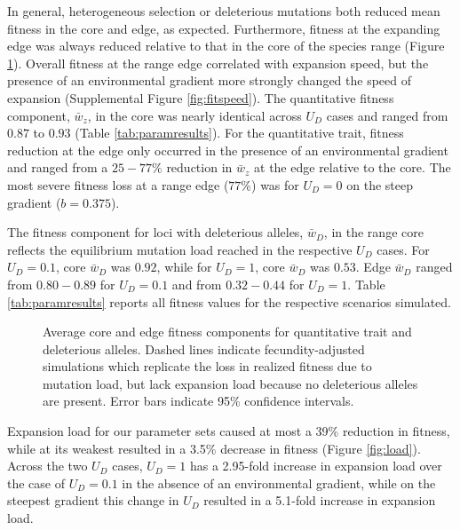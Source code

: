 In general, heterogeneous selection or deleterious mutations both reduced mean fitness in the core and edge, as expected. Furthermore, fitness at the expanding edge was always reduced relative to that in the core of the species range (Figure \ref{fig:fitness}). Overall fitness at the range edge correlated with expansion speed, but the presence of an environmental gradient more strongly changed the speed of expansion (Supplemental Figure \ref{fig:fitspeed}). The quantitative fitness component, $\bar{w}_z$, in the core was nearly identical across $U_D$ cases and ranged from $0.87$ to $0.93$ (Table \ref{tab:paramresults}). For the quantitative trait, fitness reduction at the edge only occurred in the presence of an environmental gradient and ranged from a $25-77\%$ reduction in $\bar{w}_z$ at the edge relative to the core. The most severe fitness loss at a range edge ($77\%$) was for $U_D = 0$ on the steep gradient ($b = 0.375$).

The fitness component for loci with deleterious alleles, $\bar{w}_D$, in the range core reflects the equilibrium mutation load reached in the respective $U_D$ cases. For  $U_D = 0.1$, core $\bar{w}_D$ was $0.92$, while for $U_D = 1$, core $\bar{w}_D$ was $0.53$. Edge $\bar{w}_D$ ranged from $0.80-0.89$ for $U_D = 0.1$ and from $0.32-0.44$ for $U_D = 1$. Table \ref{tab:paramresults} reports all fitness values for the respective scenarios simulated.


\begin{figure}[h]
\centering
{}
\caption[Average core and edge fitness.]{Average core and edge fitness components for quantitative trait and deleterious alleles. Dashed lines indicate fecundity-adjusted simulations which replicate the loss in realized fitness due to mutation load, but lack expansion load because no deleterious alleles are present. Error bars indicate 95\% confidence intervals.}
\label{fig:fitness}
\end{figure}


Expansion load for our parameter sets caused at most a 39\% reduction in fitness, while at its weakest resulted in a 3.5\% decrease in fitness (Figure \ref{fig:load}). %
Across the two $U_D$ cases, $U_D = 1$ has a 2.95-fold increase in expansion load over the case of $U_D = 0.1$ in the absence of an environmental gradient, while on the steepest gradient this change in $U_D$ resulted in a 5.1-fold increase in expansion load.


